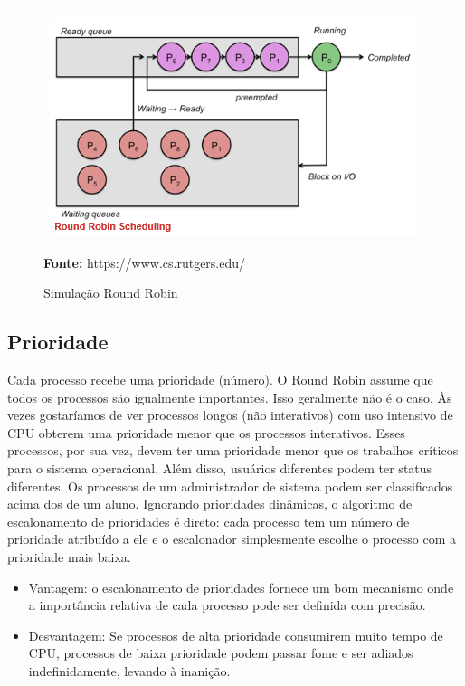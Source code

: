 \documentclass[times, 10pt,twocolumn]{article}
\begin{document}
\begin{figure}[!htb]
	\centering
	\includegraphics[width=.5\textwidth]{figuras/ilusrr}
	\caption{Simulação Round Robin} 
	\textbf{Fonte:} https://www.cs.rutgers.edu/ \cite{rutgers}
	\label{fig:figura-ilus2}
\end{figure}    

\subsection{Prioridade}  
 Cada processo recebe uma prioridade (número). O Round Robin assume que todos os processos são igualmente importantes. Isso geralmente não é o caso. Às vezes gostaríamos de ver processos longos (não interativos) com uso intensivo de CPU obterem uma prioridade menor que os processos interativos. Esses processos, por sua vez, devem ter uma prioridade menor que os trabalhos críticos para o sistema operacional.
Além disso, usuários diferentes podem ter status diferentes. Os processos de um administrador de sistema podem ser classificados acima dos de um aluno. 
Ignorando prioridades dinâmicas, o algoritmo de escalonamento de prioridades é direto: cada processo tem um número de prioridade atribuído a ele e o escalonador simplesmente escolhe o processo com a prioridade mais baixa. \cite{rutgers} 
\begin{itemize}
\item Vantagem: o escalonamento de prioridades fornece um bom mecanismo onde a importância relativa de cada processo pode ser definida com precisão.
\item Desvantagem: Se processos de alta prioridade consumirem muito tempo de CPU, processos de baixa prioridade podem passar fome e ser adiados indefinidamente, levando à inanição. 
\end{itemize} 
\end{document}

